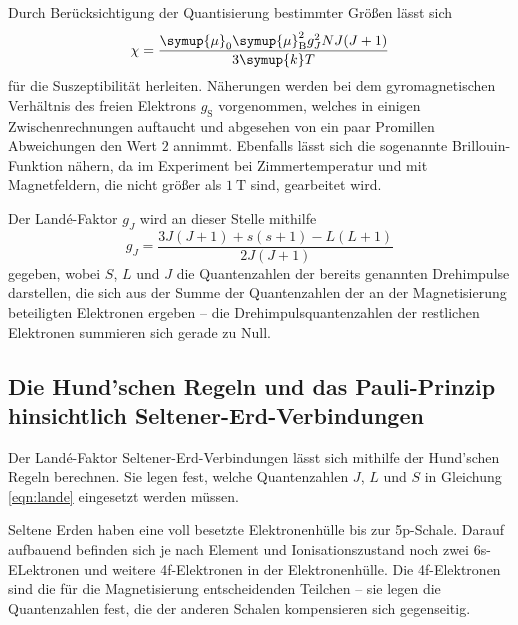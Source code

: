     Durch Berücksichtigung der Quantisierung bestimmter Größen lässt sich 
    \begin{equation}   
        \chi = \frac{\symup{\mu}_0 \symup{\mu} _\text{B}^2 g_J^2 NJ(J+1)}{3\symup{k}T}
        \label{eqn:chii}
    \end{equation}
    für die Suszeptibilität herleiten. 
    Näherungen werden bei dem gyromagnetischen Verhältnis des freien Elektrons $g_\text{S}$ vorgenommen, welches in einigen Zwischenrechnungen auftaucht und 
    abgesehen von ein paar Promillen Abweichungen den Wert $2$ annimmt. 
    Ebenfalls lässt sich die sogenannte Brillouin-Funktion nähern, da im Experiment bei Zimmertemperatur und mit 
    Magnetfeldern, die nicht größer als $\SI{1}{\tesla}$ sind, gearbeitet wird.

    Der Landé-Faktor $g_J$ wird an dieser Stelle mithilfe 
    \begin{equation}
        g_J=\frac{3J(J+1)+s(s+1)-L(L+1)}{2J(J+1)}
        \label{eqn:lande}
    \end{equation}
    gegeben, wobei $S$, $L$ und $J$ die Quantenzahlen der bereits genannten Drehimpulse darstellen, die sich aus der Summe
    der Quantenzahlen der an der Magnetisierung beteiligten Elektronen ergeben -- die Drehimpulsquantenzahlen der restlichen 
    Elektronen summieren sich gerade zu Null. 

\subsection{Die Hund'schen Regeln und das Pauli-Prinzip hinsichtlich Seltener-Erd-Verbindungen}
\label{sub:wauwau}

    Der Landé-Faktor Seltener-Erd-Verbindungen lässt sich mithilfe der Hund'schen Regeln berechnen. 
    Sie legen fest, welche Quantenzahlen $J$, $L$ und $S$ in Gleichung \eqref{eqn:lande} eingesetzt werden müssen. 

    Seltene Erden haben eine voll besetzte Elektronenhülle bis zur 5p-Schale. Darauf aufbauend befinden sich je nach 
    Element und Ionisationszustand noch zwei 6s-ELektronen und weitere 4f-Elektronen in der Elektronenhülle. 
    Die 4f-Elektronen sind die für die Magnetisierung entscheidenden Teilchen -- sie legen die Quantenzahlen fest, 
    die der anderen Schalen kompensieren sich gegenseitig. 

